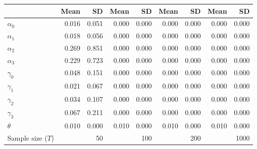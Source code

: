 
\begin{tabular}[t]{lrrrrrrrr}
\toprule
  & Mean & SD & Mean  & SD  & Mean   & SD   & Mean    & SD   \\
\midrule
$\alpha_{0}$ & 0.016 & 0.051 & 0.000 & 0.000 & 0.000 & 0.000 & 0.000 & 0.000\\
$\alpha_{1}$ & 0.018 & 0.056 & 0.000 & 0.000 & 0.000 & 0.000 & 0.000 & 0.000\\
$\alpha_{2}$ & 0.269 & 0.851 & 0.000 & 0.000 & 0.000 & 0.000 & 0.000 & 0.000\\
$\alpha_{3}$ & 0.229 & 0.723 & 0.000 & 0.000 & 0.000 & 0.000 & 0.000 & 0.000\\
$\gamma_{0}$ & 0.048 & 0.151 & 0.000 & 0.000 & 0.000 & 0.000 & 0.000 & 0.000\\
$\gamma_{1}$ & 0.021 & 0.067 & 0.000 & 0.000 & 0.000 & 0.000 & 0.000 & 0.000\\
$\gamma_{2}$ & 0.034 & 0.107 & 0.000 & 0.000 & 0.000 & 0.000 & 0.000 & 0.000\\
$\gamma_{3}$ & 0.067 & 0.211 & 0.000 & 0.000 & 0.000 & 0.000 & 0.000 & 0.000\\
$\theta$ & 0.010 & 0.000 & 0.010 & 0.000 & 0.010 & 0.000 & 0.010 & 0.000\\
Sample size ($T$) &  & 50 &  & 100 &  & 200 &  & 1000\\
\bottomrule
\end{tabular}
